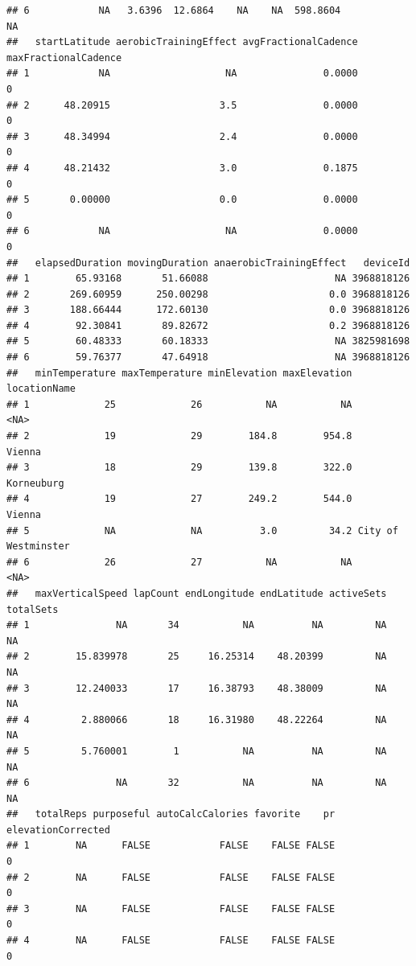 \documentclass[
]{book}
\begin{document}
\begin{verbatim}
## 6            NA   3.6396  12.6864    NA    NA  598.8604             NA
##   startLatitude aerobicTrainingEffect avgFractionalCadence maxFractionalCadence
## 1            NA                    NA               0.0000                    0
## 2      48.20915                   3.5               0.0000                    0
## 3      48.34994                   2.4               0.0000                    0
## 4      48.21432                   3.0               0.1875                    0
## 5       0.00000                   0.0               0.0000                    0
## 6            NA                    NA               0.0000                    0
##   elapsedDuration movingDuration anaerobicTrainingEffect   deviceId
## 1        65.93168       51.66088                      NA 3968818126
## 2       269.60959      250.00298                     0.0 3968818126
## 3       188.66444      172.60130                     0.0 3968818126
## 4        92.30841       89.82672                     0.2 3968818126
## 5        60.48333       60.18333                      NA 3825981698
## 6        59.76377       47.64918                      NA 3968818126
##   minTemperature maxTemperature minElevation maxElevation        locationName
## 1             25             26           NA           NA                <NA>
## 2             19             29        184.8        954.8              Vienna
## 3             18             29        139.8        322.0          Korneuburg
## 4             19             27        249.2        544.0              Vienna
## 5             NA             NA          3.0         34.2 City of Westminster
## 6             26             27           NA           NA                <NA>
##   maxVerticalSpeed lapCount endLongitude endLatitude activeSets totalSets
## 1               NA       34           NA          NA         NA        NA
## 2        15.839978       25     16.25314    48.20399         NA        NA
## 3        12.240033       17     16.38793    48.38009         NA        NA
## 4         2.880066       18     16.31980    48.22264         NA        NA
## 5         5.760001        1           NA          NA         NA        NA
## 6               NA       32           NA          NA         NA        NA
##   totalReps purposeful autoCalcCalories favorite    pr elevationCorrected
## 1        NA      FALSE            FALSE    FALSE FALSE                  0
## 2        NA      FALSE            FALSE    FALSE FALSE                  0
## 3        NA      FALSE            FALSE    FALSE FALSE                  0
## 4        NA      FALSE            FALSE    FALSE FALSE                  0

\end{verbatim}
\end{document}
